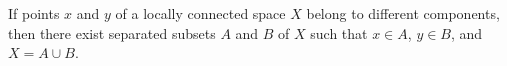 If points $x$ and $y$ of a locally connected space $X$ belong to different components, then there exist separated subsets $A$ and $B$ of $X$ such that $x \in A$, $y \in B$, and $X = A \cup B$.
